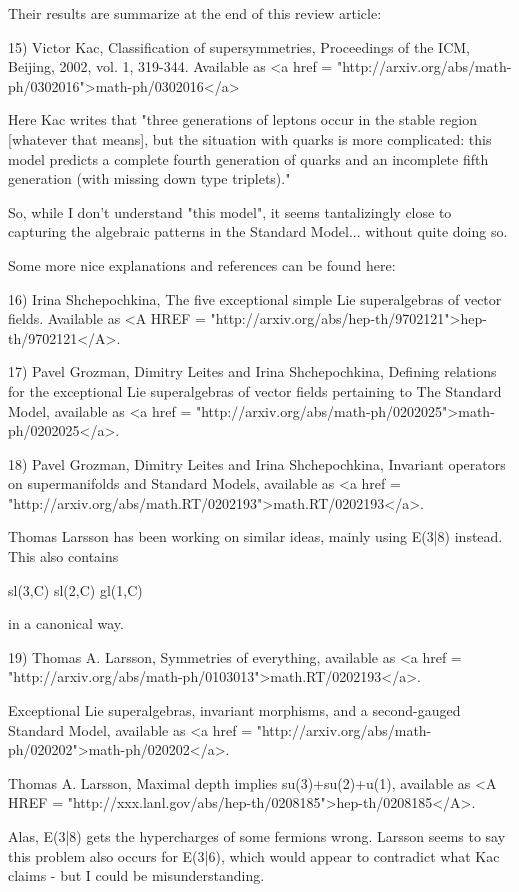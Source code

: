 Their results are summarize at the end of this review article:

15) Victor Kac, Classification of supersymmetries, Proceedings 
of the ICM, Beijing, 2002, vol. 1, 319-344.  Available as 
<a href = "http://arxiv.org/abs/math-ph/0302016">math-ph/0302016</a>

Here Kac writes that "three generations of leptons occur in 
the stable region [whatever that means], but the situation with 
quarks is more complicated: this model predicts a complete fourth 
generation of quarks and an incomplete fifth generation (with 
missing down type triplets)."  

So, while I don't understand "this model", it seems tantalizingly
close to capturing the algebraic patterns in the Standard Model... 
without quite doing so.

Some more nice explanations and references can be found here:

16) Irina Shchepochkina, The five exceptional simple Lie superalgebras
of vector fields.  Available as <A HREF =
"http://arxiv.org/abs/hep-th/9702121">hep-th/9702121</A>.

17) Pavel Grozman, Dimitry Leites and Irina Shchepochkina, 
Defining relations for the exceptional Lie superalgebras of 
vector fields pertaining to The Standard Model, available as 
<a href = "http://arxiv.org/abs/math-ph/0202025">math-ph/0202025</a>.

18) Pavel Grozman, Dimitry Leites and Irina Shchepochkina, 
Invariant operators on supermanifolds and Standard Models, 
available as <a href = "http://arxiv.org/abs/math.RT/0202193">math.RT/0202193</a>.

Thomas Larsson has been working on similar ideas, mainly 
using E(3|8) instead.  This also contains 

sl(3,C) \oplus  sl(2,C) \oplus  gl(1,C) 

in a canonical way.  

19) Thomas A. Larsson, Symmetries of everything, available as 
<a href = "http://arxiv.org/abs/math-ph/0103013">math.RT/0202193</a>.

Exceptional Lie superalgebras, invariant morphisms, and a 
second-gauged Standard Model, available as <a href = "http://arxiv.org/abs/math-ph/020202">math-ph/020202</a>.

Thomas A. Larsson, Maximal depth implies su(3)+su(2)+u(1), 
available as <A HREF = "http://xxx.lanl.gov/abs/hep-th/0208185">hep-th/0208185</A>.  

Alas, E(3|8) gets the hypercharges of some fermions wrong.  
Larsson seems to say this problem also occurs for E(3|6), 
which would appear to contradict what Kac claims - but I 
could be misunderstanding.

